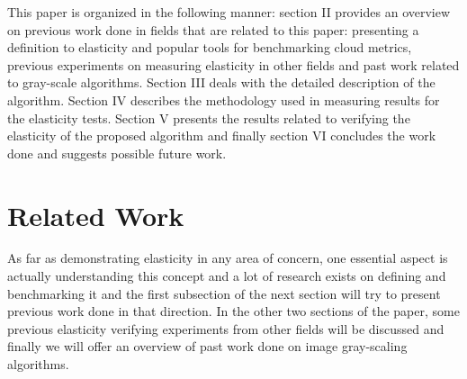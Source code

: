 \documentclass[conference]{IEEEtran}
\begin{document}
This paper is organized in the following manner: section II provides an overview on previous work done in fields that are related to this paper: presenting a definition to elasticity and popular tools for benchmarking cloud metrics, previous experiments on measuring elasticity in other fields and past work related to gray-scale algorithms. Section III deals with the detailed description of the algorithm. Section IV describes the methodology used in measuring results for the elasticity tests. Section V presents the results related to verifying the elasticity of the proposed algorithm and finally section VI concludes the work done and suggests possible future work.

\section{Related Work}
As far as demonstrating elasticity in any area of concern, one essential aspect is actually understanding this concept and a lot of research exists on defining and benchmarking it and the first subsection of the next section will try to present previous work done in that direction. In the other two sections of the paper,  some previous elasticity verifying experiments from other fields will be discussed and finally we will offer an overview of past work done on image gray-scaling algorithms.
\end{document}
